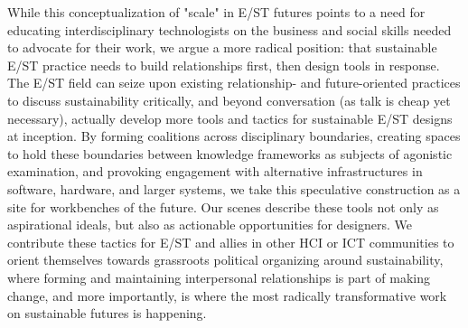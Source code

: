 \documentclass[manuscript,review,anonymous]{acmart}
\begin{document}
While this conceptualization of "scale" in E/ST futures points to a need for educating interdisciplinary technologists on the business and social skills needed to advocate for their work, we argue a more radical position: that sustainable E/ST practice needs to build relationships first, then design tools in response. The E/ST field can seize upon existing relationship- and future-oriented practices to discuss sustainability critically, and beyond conversation (as talk is cheap yet necessary), actually develop more tools and tactics for sustainable E/ST designs at inception. By forming coalitions across disciplinary boundaries, creating spaces to hold these boundaries between knowledge frameworks as subjects of agonistic examination, and provoking engagement with alternative infrastructures in software, hardware, and larger systems, we take this speculative construction as a site for  workbenches of the future. Our scenes describe these tools not only as aspirational ideals, but also as actionable opportunities for designers.
We contribute these tactics for E/ST and allies in other HCI or ICT communities to orient themselves towards grassroots political organizing around sustainability, where forming and maintaining interpersonal relationships is part of making change, and more importantly, is where the most radically transformative work on sustainable futures is happening.





\end{document}
